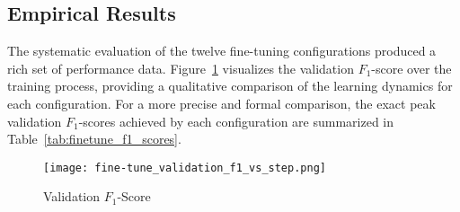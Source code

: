 \subsection{Empirical Results}\label{ch:4.4.2}
The systematic evaluation of the twelve fine-tuning configurations produced a rich set of performance data. Figure~\ref{fig:binaryf1} visualizes the validation \(F_1\)-score over the training process, providing a qualitative comparison of the learning dynamics for each configuration. For a more precise and formal comparison, the exact peak validation \(F_1\)-scores achieved by each configuration are summarized in Table~\ref{tab:finetune_f1_scores}.
\begin{figure}[tb]
    \captionsetup{skip=5pt}
    \centering
    \texttt{[image: fine-tune\_validation\_f1\_vs\_step.png]}
    \caption{Validation \(F_1\)-Score}
    \label{fig:binaryf1}
\end{figure}
\begin{table}[tb]
    \captionsetup{skip=5pt}
    \centering
    \caption{Peak Validation F1-Score of Fine-Tuning Configurations on BGE Model}
    \label{tab:finetune_f1_scores}
\end{table}

